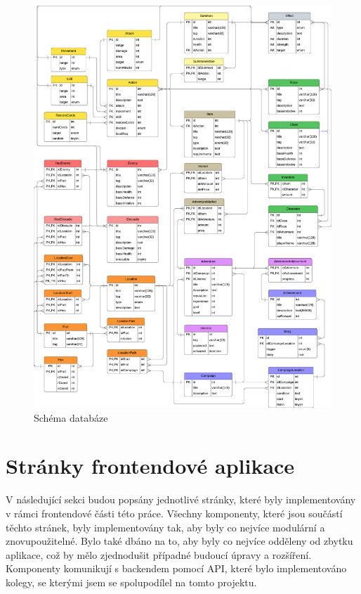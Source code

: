 \begin{figure}[htbp]
  \centering
  \includegraphics[width=.95\textwidth]{../../shared/diagrams/dbScheme.pdf}
  \caption{Schéma databáze}
  \label{fig:db_schema}
\end{figure}

\section{Stránky frontendové aplikace}
V následující sekci budou popsány jednotlivé stránky, které byly implementovány v rámci frontendové části této práce. Všechny komponenty, které jsou součástí těchto stránek, byly implementovány tak, aby byly co nejvíce modulární a znovupoužitelné. Bylo také dbáno na to, aby byly co nejvíce odděleny od zbytku aplikace, což by mělo zjednodušit případné budoucí úpravy a rozšíření. Komponenty komunikují s backendem pomocí API, které bylo implementováno kolegy, se kterými jsem se spolupodílel na tomto projektu.

